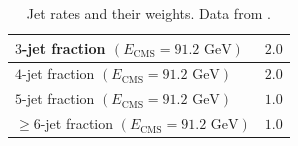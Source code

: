 \documentclass[aps,preprint,floatfix,nofootinbib,showpacs]{revtex4-1}
\begin{document}
\begin{table}[tbp]
\begin{center}
\begin{tabular}{l|l}
    $3$-jet fraction $(E_{\text{CMS}}=91.2 \text{ GeV})$               &  \hspace{3cm} $2.0$ \\ \hline
    $4$-jet fraction $(E_{\text{CMS}}=91.2 \text{ GeV})$               &  \hspace{3cm} $2.0$ \\ \hline
    $5$-jet fraction $(E_{\text{CMS}}=91.2 \text{ GeV})$               &  \hspace{3cm} $1.0$ \\ \hline
    $\geq 6$-jet fraction $(E_{\text{CMS}}=91.2 \text{ GeV})$          &  \hspace{3cm} $1.0$ \\ \hline \hline
   \end{tabular}
  \end{center}
  \caption{Jet rates and their weights. Data from \cite{Abreu:1996na, Heister:2003aj}.}
  \label{Tab3}
 \end{table}
 
\end{document}
